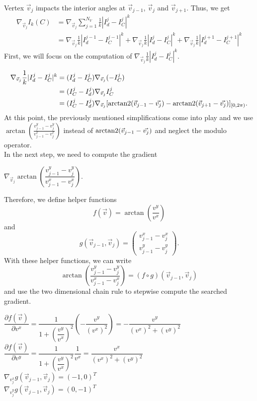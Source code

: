 \begin{proposition}
	Vertex $\vec{v}_j$ impacts the interior angles at $\vec{v}_{j-1}$, $\vec{v}_j$ and $\vec{v}_{j+1}$. 
	Thus, we get 
	\begin{align*}
		\nabla_{\vec{v}_j}  I_{k}(C) &=  \nabla_{\vec{v}_j} \sum\limits_{j=1}^{N_V} \frac{1}{k}| I^{j}_d - I^j_{C} |^k \\
		&= \nabla_{\vec{v}_j} \frac{1}{k}| I^{j-1}_d - I^{j-1}_{C} |^k 
		+ \nabla_{\vec{v}_j} \frac{1}{k}| I^{j}_d - I^{j}_{C} |^k
		+ \nabla_{\vec{v}_j} \frac{1}{k}| I^{j+1}_d - I^{j+1}_{C} |^k
	\end{align*}
	First, we will focus on the computation of $\nabla_{\vec{v}_j} \frac{1}{k}| I^{j}_d - I^{j}_{C} |^k$. 

	\begin{align*}
		\nabla_{\vec{v}_j} \frac{1}{k}| I^{j}_d - I^{j}_{C} |^k 
		&= (I^{j}_d - I^j_{C}) \nabla_{\vec{v}_j} (- I^j_{C})\\
		&= (I^j_{C} - I^{j}_d) \nabla_{\vec{v}_j}  I^j_{C}   \\
		&= (I^j_{C} - I^{j}_d) \nabla_{\vec{v}_j} [\operatorname{arctan2}(\vec{v}_{j-1} - \vec{v_j}) - \operatorname{arctan2}(\vec{v}_{j+1} - \vec{v_j})]_{[0,2\pi)}.
	\end{align*}
	At this point, the previously mentioned simplifications come into play and we use $\arctan\! \left(\frac{v_{j-1}^{y} - v_{j}^{y}}{v_{j-1}^{x} - v_{j}^{x}} \right)$ instead of $\operatorname{arctan2}(\vec{v}_{j-1} - \vec{v_j})$ and neglect the modulo operator. \\
	In the next step, we need to compute the gradient 
	\begin{center}
		$
		\nabla_{\vec{v}_j} \arctan\! \left(\dfrac{v_{j-1}^{y} - v_{j}^{y}}{v_{j-1}^{x} - v_{j}^{x}} \right).
		$
	\end{center}
	
	Therefore, we define helper functions 
	$$ f(\vec{v}) = \arctan\!\left( \frac{v^{y}}{v^{x}} \right)$$ 
	and 
	$$g(\vec{v}_{j-1}, \vec{v}_{j}) = \begin{pmatrix}
		v_{j-1}^{x} - v_{j}^{x} \\[0.5em] 
		v_{j-1}^{y} - v_{j}^{y}
	\end{pmatrix}.$$
	With these helper functions, we can write 
	$$ \arctan\!\left(\frac{v_{j-1}^{y} - v_{j}^{y}}{v_{j-1}^{x} - v_{j}^{x}}\right) = (f \circ g) (\vec{v}_{j-1}, \vec{v}_{j}) $$
	and use the two dimensional chain rule to stepwise compute the searched gradient. 
 
	\begin{center}
		
		$\dfrac{\partial f(\vec{v})}{\partial v^{x}} = \dfrac{1}{1 + \left(\dfrac{v^{y}}{v^{x}}\right)^2} \left(- \dfrac{v^{y}}{(v^{x})^2}\right) = - \dfrac{v^{y}}{(v^{x})^2 + (v^{y})^2}$ \\
		$\dfrac{\partial f(\vec{v})}{\partial v^{y}} = \dfrac{1}{1 + \left(\dfrac{v^{y}}{v^{x}}\right)^2}  \dfrac{1}{v^{x}} =  \dfrac{v^{x}}{(v^{x})^2 + (v^{y})^2}$ \\ [0.5em]
		$ \nabla_{v_j^{x}} g(\vec{v}_{j-1}, \vec{v}_{j}) = (-1, 0)^T$ \\
		$ \nabla_{v_j^{y}} g(\vec{v}_{j-1}, \vec{v}_{j}) = (0, -1)^T$ 
	

\end{center}
\end{proposition}

